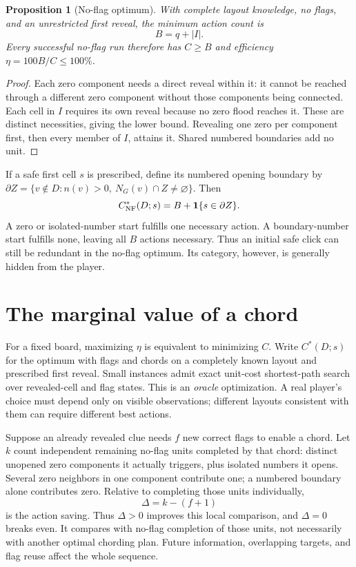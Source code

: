 \documentclass[11pt,letterpaper]{article}
\newtheorem{proposition}{Proposition}
\newcommand{\ind}{\mathbf{1}}
\begin{document}
\begin{proposition}[No-flag optimum]\label{prop:nf}
With complete layout knowledge, no flags, and an unrestricted first reveal, the minimum action count is
\begin{equation}\label{eq:bbbv}
 B=q+|I|.
\end{equation}
Every successful no-flag run therefore has $C\geq B$ and efficiency $\eta=100B/C\leq100\%$.
\end{proposition}
\begin{proof}
Each zero component needs a direct reveal within it: it cannot be reached through a different zero component without those components being connected. Each cell in $I$ requires its own reveal because no zero flood reaches it. These are distinct necessities, giving the lower bound. Revealing one zero per component first, then every member of $I$, attains it. Shared numbered boundaries add no unit.
\end{proof}

If a safe first cell $s$ is prescribed, define its numbered opening boundary by
$\partial Z=\{v\notin D:n(v)>0,\ N_G(v)\cap Z\neq\varnothing\}$. Then
\begin{equation}\label{eq:fixednf}
 C^*_{\rm NF}(D;s)=B+\ind\{s\in\partial Z\}.
\end{equation}
A zero or isolated-number start fulfills one necessary action. A boundary-number start fulfills none, leaving all $B$ actions necessary. Thus an initial safe click can still be redundant in the no-flag optimum. Its category, however, is generally hidden from the player.

\section{The marginal value of a chord}
For a fixed board, maximizing $\eta$ is equivalent to minimizing $C$. Write $C^*(D;s)$ for the optimum with flags and chords on a completely known layout and prescribed first reveal. Small instances admit exact unit-cost shortest-path search over revealed-cell and flag states. This is an \emph{oracle} optimization. A real player's choice must depend only on visible observations; different layouts consistent with them can require different best actions.

Suppose an already revealed clue needs $f$ new correct flags to enable a chord. Let $k$ count independent remaining no-flag units completed by that chord: distinct unopened zero components it actually triggers, plus isolated numbers it opens. Several zero neighbors in one component contribute one; a numbered boundary alone contributes zero. Relative to completing those units individually,
\begin{equation}\label{eq:gain}
 \Delta=k-(f+1)
\end{equation}
is the action saving. Thus $\Delta>0$ improves this local comparison, and $\Delta=0$ breaks even. It compares with no-flag completion of those units, not necessarily with another optimal chording plan. Future information, overlapping targets, and flag reuse affect the whole sequence.
\end{document}
